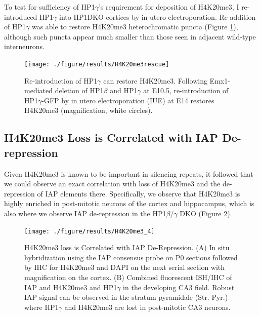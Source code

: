 \documentclass[onehalf,12pt]{beavtex}
\begin{document}
  To test for sufficiency of HP1\(\gamma\)'s requirement for deposition of
  H4K20me3, I re-introduced HP1\(\gamma\) into HP1DKO cortices by in-utero
  electroporation. Re-addition of HP1\(\gamma\) was able to restore
  H4K20me3 heterochromatic puncta (Figure \ref{fig:H4K20me3rescue}),
  although such puncta appear much smaller than those seen in adjacent
  wild-type interneurons.
  
  \begin{figure}
  
  {\centering \texttt{[image: ./figure/results/H4K20me3rescue]} 
  
  }
  
  \caption[Re-introduction of HP1$\gamma$ can restore H4K20me3]{Re-introduction of HP1$\gamma$ can restore H4K20me3.  Following Emx1-mediated deletion of HP1$\beta$ and HP1$\gamma$ at E10.5, re-introduction of HP1$\gamma$-GFP by in utero electroporation (IUE) at E14 restores H4K20me3 (magnification, white circles).}\label{fig:H4K20me3rescue}
  \end{figure}
  
  \subsection{H4K20me3 Loss is Correlated with IAP
  De-repression}\label{h4k20me3-loss-is-correlated-with-iap-de-repression}
  
  Given H4K20me3 is known to be important in silencing repeats, it
  followed that we could observe an exact correlation with loss of
  H4K20me3 and the de-repression of IAP elements there. Specifically, we
  observe that H4K20me3 is highly enriched in post-mitotic neurons of the
  cortex and hippocampus, which is also where we observe IAP de-repression
  in the HP1\(\beta\)/\(\gamma\) DKO (Figure \ref{fig:H4K20me3corr}).
  
  \begin{figure}
  
  {\centering \texttt{[image: ./figure/results/H4K20me3\_4]} 
  
  }
  
  \caption[H4K20me3 loss is Correlated with IAP De-Repression]{H4K20me3 loss is Correlated with IAP De-Repression. (A) In situ hybridization using the IAP consensus probe on P0 sections followed by IHC for H4K20me3 and DAPI on the next serial section with magnification on the cortex. (B) Combined fluorescent ISH/IHC of IAP and H4K20me3 and HP1$\gamma$ in the developing CA3 field.  Robust IAP signal can be observed in the stratum pyramidale (Str. Pyr.) where HP1$\gamma$ and H4K20me3 are lost in post-mitotic CA3 neurons.}\label{fig:H4K20me3corr}
  \end{figure}
  
\end{document}
